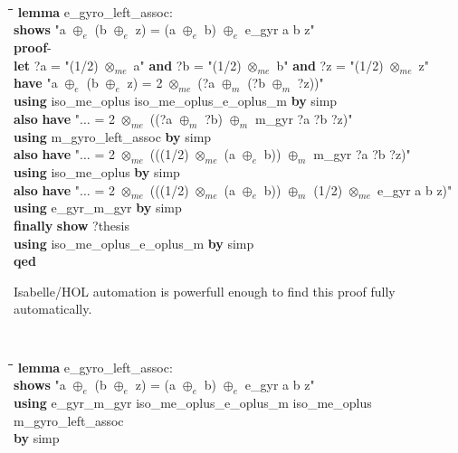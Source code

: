 \documentclass[a4paper]{article}
\newcommand{\tab}{\hspace{5mm}}
\theoremstyle{definition}
\begin{document}
{\tt
\begin{small}
\begin{tabbing}
  \tab\=\tab\=\tab\=\tab\=\kill
{\bf lemma} e\_gyro\_left\_assoc:\\
\>  {\bf shows} "a $\oplus_e$ (b $\oplus_e$ z) = (a $\oplus_e$ b) $\oplus_e$ e\_gyr a b z"\\
{\bf proof}-\\
\>  {\bf let} ?a = "(1/2) $\otimes_{me}$ a" {\bf and} ?b = "(1/2) $\otimes_{me}$ b" {\bf and} ?z = "(1/2) $\otimes_{me}$ z"\\
\>  {\bf have} "a $\oplus_e$ (b $\oplus_e$ z) = 2 $\otimes_{me}$ (?a $\oplus_m$ (?b $\oplus_m$ ?z))"\\
\>\>    {\bf using} iso\_me\_oplus iso\_me\_oplus\_e\_oplus\_m {\bf by} simp\\
\>  {\bf also} {\bf have} "$\ldots$ = 2 $\otimes_{me}$ ((?a $\oplus_m$ ?b) $\oplus_m$ m\_gyr ?a ?b ?z)"\\
\>\>    {\bf using} m\_gyro\_left\_assoc {\bf by} simp\\
\>  {\bf also} {\bf have} "$\ldots$ = 2 $\otimes_{me}$ (((1/2) $\otimes_{me}$ (a $\oplus_e$ b)) $\oplus_m$ m\_gyr ?a ?b ?z)"\\
\>\>    {\bf using} iso\_me\_oplus {\bf by} simp\\
\>  {\bf also} {\bf have} "$\ldots$ = 2 $\otimes_{me}$ (((1/2) $\otimes_{me}$ (a $\oplus_e$ b)) $\oplus_m$ (1/2) $\otimes_{me}$ e\_gyr a b z)"\\
\>\>    {\bf using} e\_gyr\_m\_gyr {\bf by} simp\\
\>  {\bf finally} {\bf show} ?thesis\\
\>\>    {\bf using} iso\_me\_oplus\_e\_oplus\_m {\bf by} simp\\
{\bf qed}
\end{tabbing}
\end{small}
}

Isabelle/HOL automation is powerfull enough to find this proof fully
automatically.

{\tt
\begin{small}
\begin{tabbing}
  \tab\=\tab\=\tab\=\tab\=\kill
{\bf lemma} e\_gyro\_left\_assoc:\\
\>  {\bf shows} "a $\oplus_e$ (b $\oplus_e$ z) = (a $\oplus_e$ b) $\oplus_e$ e\_gyr a b z"\\
{\bf using} e\_gyr\_m\_gyr iso\_me\_oplus\_e\_oplus\_m iso\_me\_oplus m\_gyro\_left\_assoc\\
{\bf by} simp
\end{tabbing}
\end{small}
}
\end{document}
